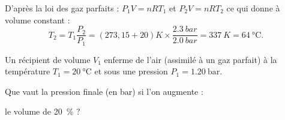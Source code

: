 
\begin{corrige}
D'après la loi des gaz parfaits : $P_{1}V=nR T_{1}$ et  $P_{2}V = nR T_{2}$ ce qui donne à volume constant : 
\[
T_{2}= T_{1} \frac{P_{2}} {P_{1}}
= (273,15+20)\si{K} \times  \frac{\SI{2.3}{bar}}{\SI{2.0}{bar}}=
\SI{337}{K}=\SI{64}{\celsius}.
\]
\end{corrige}


\finEntrainement




\titreEntrainementFacultatif	{}
\hauteurLargeurCadreReponse		{7mm}{25mm}
\initialisationEntrainement

Un récipient de volume $V_{1}$ enferme de l'air (assimilé à un gaz parfait) à la température $T_1=\SI{20}{\celsius}$ et sous une pression $P_{1}=\SI{1.20}{\bar}$. %

Que vaut la pression finale (en bar) si l'on augmente :

\debutEntrainement


\begin{enonce}
le volume de \SI{20}{\percent} ?
\end{enonce}

